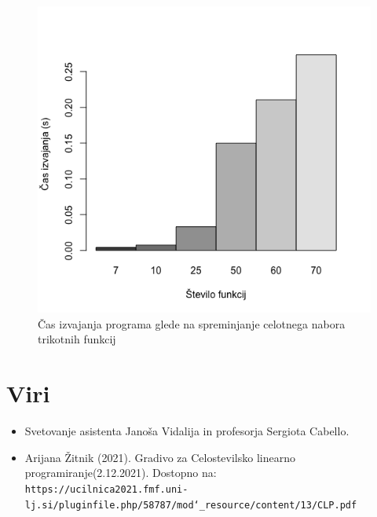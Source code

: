 \documentclass[11pt]{article}
\theoremstyle{definition}
\newcommand{\1}{\mathbbm{1}}
\begin{document}
\begin{figure}[h!]
	\centering
	\includegraphics[scale=0.55]{casi.png}
	\caption{Čas izvajanja programa glede na spreminjanje celotnega nabora trikotnih funkcij}
\end{figure}



\newpage{}
\section{Viri}
\begin{itemize}
\item Svetovanje asistenta Janoša Vidalija in profesorja Sergiota Cabello.
\item Arijana Žitnik (2021). Gradivo za Celostevilsko linearno programiranje(2.12.2021). Dostopno na:\\
\texttt{https://ucilnica2021.fmf.uni-lj.si/pluginfile.php/58787/mod\char`_resource/content/13/CLP.pdf}

\end{itemize}
\end{document}
